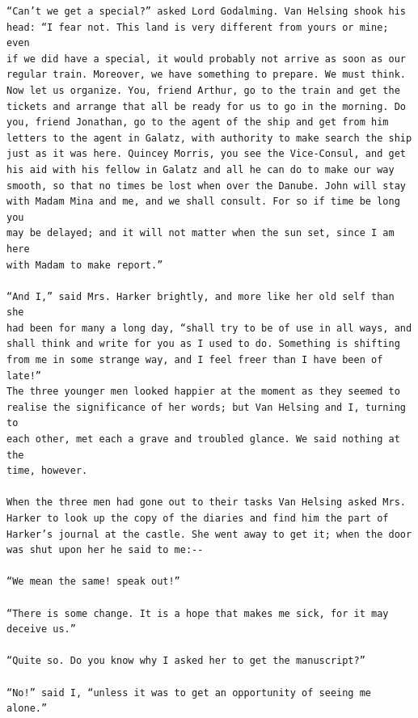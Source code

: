 \documentclass{article}
\begin{document}
\begin{verbatim}
“Can’t we get a special?” asked Lord Godalming. Van Helsing shook his
head: “I fear not. This land is very different from yours or mine; even
if we did have a special, it would probably not arrive as soon as our
regular train. Moreover, we have something to prepare. We must think.
Now let us organize. You, friend Arthur, go to the train and get the
tickets and arrange that all be ready for us to go in the morning. Do
you, friend Jonathan, go to the agent of the ship and get from him
letters to the agent in Galatz, with authority to make search the ship
just as it was here. Quincey Morris, you see the Vice-Consul, and get
his aid with his fellow in Galatz and all he can do to make our way
smooth, so that no times be lost when over the Danube. John will stay
with Madam Mina and me, and we shall consult. For so if time be long you
may be delayed; and it will not matter when the sun set, since I am here
with Madam to make report.”

“And I,” said Mrs. Harker brightly, and more like her old self than she
had been for many a long day, “shall try to be of use in all ways, and
shall think and write for you as I used to do. Something is shifting
from me in some strange way, and I feel freer than I have been of late!”
The three younger men looked happier at the moment as they seemed to
realise the significance of her words; but Van Helsing and I, turning to
each other, met each a grave and troubled glance. We said nothing at the
time, however.

When the three men had gone out to their tasks Van Helsing asked Mrs.
Harker to look up the copy of the diaries and find him the part of
Harker’s journal at the castle. She went away to get it; when the door
was shut upon her he said to me:--

“We mean the same! speak out!”

“There is some change. It is a hope that makes me sick, for it may
deceive us.”

“Quite so. Do you know why I asked her to get the manuscript?”

“No!” said I, “unless it was to get an opportunity of seeing me alone.”


\end{verbatim}
\end{document}
